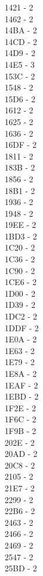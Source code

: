 \documentclass[10pt,letterpaper]{article}
\begin{document}
\begin{multicols}{5}
1421 -  2\\
1462 -  2\\
14BA -  2\\
14CD -  2\\
14D9 -  2\\
14E5 -  3\\
153C -  2\\
1548 -  2\\
15D6 -  2\\
1612 -  2\\
1625 -  2\\
1636 -  2\\
16DF -  2\\
1811 -  2\\
183B -  2\\
1856 -  2\\
18B1 -  2\\
1936 -  2\\
1948 -  2\\
19EE -  2\\
1BD3 -  2\\
1C20 -  2\\
1C36 -  2\\
1C90 -  2\\
1CE6 -  2\\
1D00 -  2\\
1D39 -  2\\
1DC2 -  2\\
1DDF -  2\\
1E0A -  2\\
1E63 -  2\\
1E79 -  2\\
1E8A -  2\\
1EAF -  2\\
1EBD -  2\\
1F2E -  2\\
1F6C -  2\\
1F9B -  2\\
202E -  2\\
20AD -  2\\
20C8 -  2\\
2105 -  2\\
21E7 -  2\\
2299 -  2\\
22B6 -  2\\
2463 -  2\\
2466 -  2\\
2469 -  2\\
2547 -  2\\
25BD -  2\\

\end{multicols}
\end{document}
